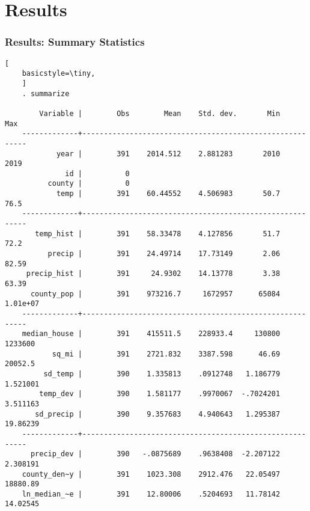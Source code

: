 \documentclass{beamer}
\begin{document}
\section{Results}
\begin{frame}[fragile]
\frametitle{Results: Summary Statistics}
\begin{lstlisting}[
    basicstyle=\tiny,
    ]
    . summarize

        Variable |        Obs        Mean    Std. dev.       Min        Max
    -------------+---------------------------------------------------------
            year |        391    2014.512    2.881283       2010       2019
              id |          0
          county |          0
            temp |        391    60.44552    4.506983       50.7       76.5
    -------------+---------------------------------------------------------
       temp_hist |        391    58.33478    4.127856       51.7       72.2
          precip |        391    24.49714    17.73149       2.06      82.59
     precip_hist |        391     24.9302    14.13778       3.38      63.39
      county_pop |        391    973216.7     1672957      65084   1.01e+07
    -------------+---------------------------------------------------------
    median_house |        391    415511.5    228933.4     130800    1233600
           sq_mi |        391    2721.832    3387.598      46.69    20052.5
         sd_temp |        390    1.335813    .0912748   1.186779   1.521001
        temp_dev |        390    1.581177    .9970067  -.7024201   3.511163
       sd_precip |        390    9.357683    4.940643   1.295387   19.86239
    -------------+---------------------------------------------------------
      precip_dev |        390   -.0875689    .9638408  -2.207122   2.308191
    county_den~y |        391    1023.308    2912.476   22.05497   18880.89
    ln_median_~e |        391    12.80006    .5204693   11.78142   14.02545


\end{lstlisting}
\end{frame}
\end{document}
